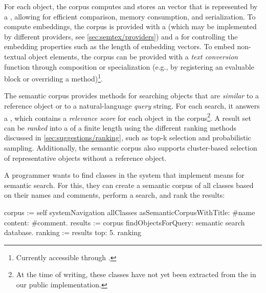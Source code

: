 For each object, the corpus computes and stores an  vector that is represented by a , allowing for efficient comparison, memory consumption, and serialization.
To compute embeddings, the corpus is provided with a  (which may be implemented by different providers, see \cref{sec:semtex/providers}) and a  for controlling the embedding properties such as the length of embedding vectors.
To embed non-textual object elements, the corpus can be provided with a \emph{text conversion} function through composition or specialization (e.g., by registering an evaluable block or overriding a method)\footnote{Currently accessible through .}.

The semantic corpus provides methods for searching objects that are \emph{similar} to a reference object or to a natural-language \emph{query} string.
For each search, it answers a , which contains a \emph{relevance score} for each object in the corpus\footnote{At the time of writing, these classes have not yet been extracted from the  in our public implementation.}.
A result set can be \emph{ranked} into a  of a finite length using the different ranking methods discussed in \cref{sec:suggestions/ranking}, such as top-k selection and probabilistic sampling.
Additionally, the semantic corpus also supports cluster-based selection of representative objects without a reference object.

\begin{example}[5]
	A programmer wants to find classes in the system that implement means for semantic search.
	For this, they can create a semantic corpus of all classes based on their names and comments, perform a search, and rank the results:

	\begin{multicode}
		corpus := self systemNavigation allClasses \newline
		\null\qquad	asSemanticCorpusWithTitle: \#name \newline
		\null\qquad	content: \#comment. \newline
		results := corpus findObjectsForQuery: \textquotesingle semantic search database\textquotesingle. \newline
		ranking := results top: 5. \newline
		ranking 
	\end{multicode}
\end{example}

